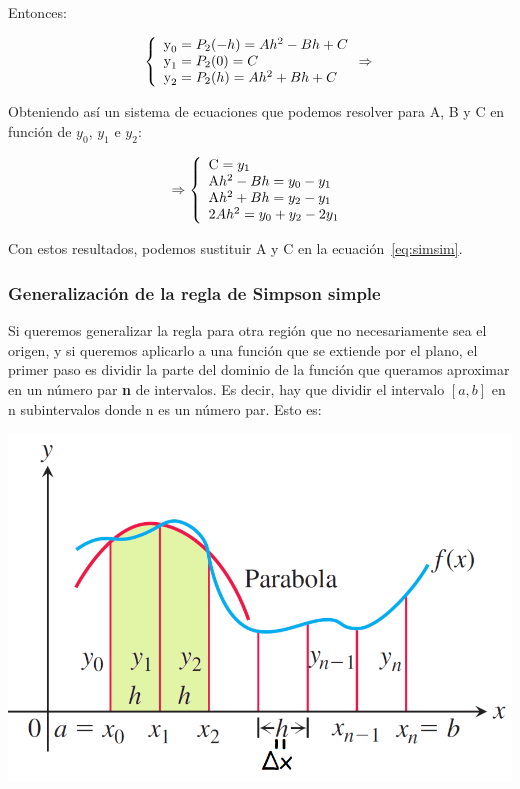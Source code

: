 \documentclass[12pt]{article}
\begin{document}
Entonces:

\begin{equation*}
\left\lbrace
\begin{array}{ll}
\textup y_0 = P_2(-h) = Ah^2-Bh+C\\
\textup y_1 = P_2(0) = C\\
\textup y_2 = P_2(h) = Ah^2+Bh+C\\
\end{array}
\Rightarrow\right.
\end{equation*}

Obteniendo así un sistema de ecuaciones que podemos resolver para A, B y C en función de $y_0$, $y_1$ e $y_2$:

\begin{equation}
\Rightarrow
\left\lbrace
\begin{array}{ll}
\textup C = y_1\\
\textup Ah^2-Bh = y_0 - y_1\\
\textup Ah^2+Bh = y_2 - y_1\\
\textup 2Ah^2 = y_0 + y_2 - 2y_1\\
\end{array}
\right.
\end{equation}

Con estos resultados, podemos sustituir A y C en la ecuación~\ref{eq:simsim}.

\subsubsection{Generalización de la regla de Simpson simple}

Si queremos generalizar la regla para otra región que no necesariamente sea el origen, y si queremos aplicarlo a una función que se extiende por el plano, el primer paso es dividir la parte del dominio de la función que queramos aproximar en un número par \textbf{n} de intervalos. Es decir, hay que dividir el intervalo $[a,b]$ en n subintervalos donde n es un número par. Esto es:

\begin{center}
\includegraphics[scale=0.5]{simple_n}
\end{center}
\end{document}
